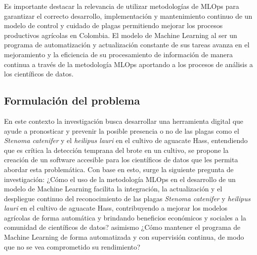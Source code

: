 Es importante destacar la relevancia de utilizar metodologías de MLOps para garantizar el correcto desarrollo, implementación y mantenimiento continuo de un modelo de control y cuidado de plagas permitiendo mejorar los procesos productivos agrícolas en Colombia. El modelo de Machine Learning al ser un programa de automatización y actualización constante de sus tareas avanza en el mejoramiento y la eficiencia de su procesamiento de información de manera continua a través de la metodología MLOps aportando a los procesos de análisis a los científicos de datos.

\subsection{Formulación del problema}

En este contexto la investigación busca desarrollar una herramienta digital que ayude a pronosticar y prevenir la posible presencia o no de las plagas como el \textit{Stenoma catenifer} y el \textit{heilipus lauri} en el cultivo de aguacate Hass, entendiendo que es crítica la detección temprana del brote en un cultivo, se propone la creación de un software accesible para los científicos de datos que les permita abordar esta problemática. Con base en esto, surge la siguiente pregunta de investigación: ¿Cómo el uso de la metodología MLOps en el desarrollo de un modelo de Machine Learning facilita la integración, la actualización y el despliegue continuo del reconocimiento de las plagas \textit{Stenoma catenifer} y \textit{heilipus lauri} en el cultivo de aguacate Hass, contribuyendo a mejorar los modelos agrícolas de forma automática y brindando beneficios económicos y sociales a la comunidad de científicos de datos? asimismo ¿Cómo mantener el programa de Machine Learning de forma automatizada y con supervisión continua, de modo que no se vea comprometido su rendimiento?